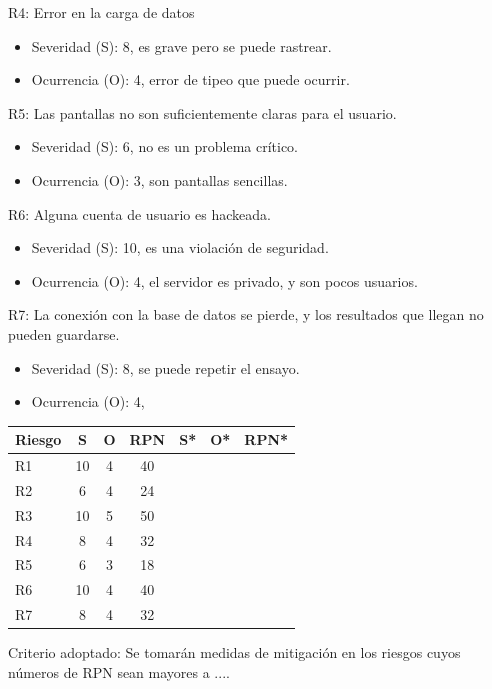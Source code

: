 \documentclass[11pt]{charter}
\begin{document}
R4: Error en la carga de datos
\begin{itemize}
\item Severidad (S): 8, es grave pero se puede rastrear.
\item Ocurrencia (O): 4, error de tipeo que puede ocurrir.
\end{itemize}

R5: Las pantallas no son suficientemente claras para el usuario.
\begin{itemize}
\item Severidad (S): 6, no es un problema crítico.
\item Ocurrencia (O): 3, son pantallas sencillas.
\end{itemize}

R6: Alguna cuenta de usuario es hackeada.
\begin{itemize}
\item Severidad (S): 10, es una violación de seguridad.
\item Ocurrencia (O): 4, el servidor es privado, y son pocos usuarios.
\end{itemize}

R7: La conexión con la base de datos se pierde, y los resultados que llegan no pueden guardarse.
\begin{itemize}
\item Severidad (S): 8, se puede repetir el ensayo.
\item Ocurrencia (O): 4, 
\end{itemize}

\begin{table}[htpb]
\centering
\begin{tabularx}{\linewidth}{@{}|X|c|c|c|c|c|c|@{}}
\hline
\rowcolor[HTML]{C0C0C0} 
Riesgo & S & O & RPN & S* & O* & RPN* \\ \hline
R1 & 10 & 4 & 40 &  &  &    \\ \hline
R2 & 6 & 4 & 24 &  &  &    \\ \hline
R3 & 10 & 5 & 50 &  &  &    \\ \hline
R4 & 8 & 4 & 32 &  &  &    \\ \hline
R5 & 6 & 3 & 18 &  &  &    \\ \hline
R6 & 10 & 4 & 40 &  &  &    \\ \hline
R7 & 8 & 4 & 32 &  &  &    \\ \hline
\end{tabularx}%
\end{table}

Criterio adoptado: 
Se tomarán medidas de mitigación en los riesgos cuyos números de RPN sean mayores a ....
\end{document}
